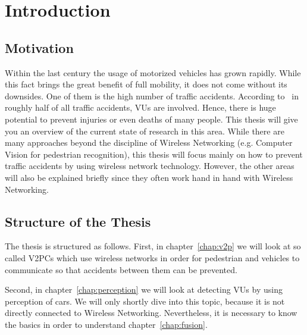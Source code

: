 \documentclass[]{ccs-thesis}
\begin{document}
\cleardoublepage
\tableofcontents
{}

\cleardoublepage
{}


\chapter{Introduction}
\label{chap:introduction}


\section{Motivation}
\label{sec:motivation}

Within the last century the usage of motorized vehicles has grown rapidly. While this fact brings the great benefit of full mobility, it does not come without its downsides. One of them is the high number of traffic accidents. According to~\cite{v2pcomm} in roughly half of all traffic accidents, \acp{VU} are involved. Hence, there is huge potential to prevent injuries or even deaths of many people. This thesis will give you an overview of the current state of research in this area. While there are many approaches beyond the discipline of Wireless Networking (e.g. Computer Vision for pedestrian recognition), this thesis will focus mainly on how to prevent traffic accidents by using wireless network technology. However, the other areas will also be explained briefly since they often work hand in hand with Wireless Networking.

\section{Structure of the Thesis}
\label{sec:structure}

The thesis is structured as follows. First, in chapter~\ref{chap:v2p} we will look at so called \acp{V2PC} which use wireless networks in order for pedestrian and vehicles to communicate so that accidents between them can be prevented.

Second, in chapter~\ref{chap:perception} we will look at detecting \acp{VU} by using perception of cars. We will only shortly dive into this topic, because it is not directly connected to Wireless Networking. Nevertheless, it is necessary to know the basics in order to understand chapter~\ref{chap:fusion}.
\end{document}
